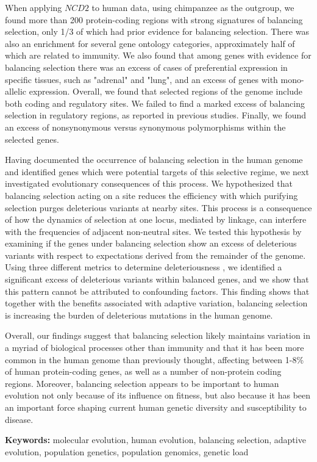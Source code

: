 \begin{small}
When applying $NCD2$ to human data, using chimpanzee as the outgroup, we found more than 200 protein-coding regions with strong signatures of balancing selection, only 1/3 of which had prior evidence for balancing selection. There was also an enrichment for several gene ontology categories, approximately half of which are related to immunity. We also found that among genes with evidence for balancing selection there was an excess of cases of preferential expression in specific tissues, such as "adrenal" and "lung", and an excess of genes with mono-allelic expression. Overall, we found that selected regions of the genome include both coding and regulatory sites. We failed to find a marked excess of balancing selection in regulatory regions, as reported in previous studies. Finally, we found an excess of nonsynonymous versus synonymous polymorphisms within the selected genes.

Having documented the occurrence of balancing selection in the human genome and identified genes which were potential targets of this selective regime, we next investigated evolutionary consequences of this process. We hypothesized that balancing selection acting on a site reduces the efficiency with which purifying selection purges deleterious variants at nearby sites. This process is a consequence of how the dynamics of selection at one locus, mediated by linkage, can interfere with the frequencies of adjacent non-neutral sites. We tested this hypothesis by examining if the genes under balancing selection show an excess of deleterious variants with respect to expectations derived from the remainder of the genome. Using three different metrics to determine deleteriousness , we identified a significant excess of deleterious variants within balanced genes, and we show that this pattern cannot be attributed to confounding factors. This finding shows that together with the benefits associated with adaptive variation, balancing selection is increasing the burden of deleterious mutations in the human genome. 

Overall, our findings suggest that balancing selection likely maintains variation in a myriad of biological processes other than immunity and that it has been more common in the human genome than previously thought, affecting between 1-8\% of human protein-coding genes, as well as a number of non-protein coding regions. Moreover, balancing selection appears to be important to human evolution not only because of its influence on fitness, but also because it has been an important force shaping current human genetic diversity and susceptibility to disease.

\vspace{1em}
\noindent\textbf{Keywords:} molecular evolution, human evolution, balancing selection, adaptive evolution, population genetics, population genomics, genetic load
\end{small}

